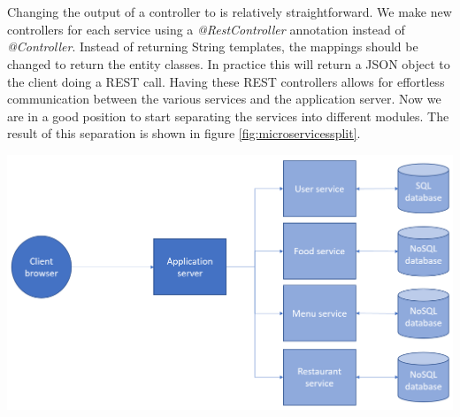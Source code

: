 \documentclass[12pt]{article}
\newenvironment{Figure}
	{\par\medskip\noindent\minipage{\linewidth}}
	{\endminipage\par\medskip}
\begin{document}
\begin{multicols}{2}
\\\\
Changing the output of a controller to is relatively straightforward. We make new controllers for each service using a \textit{@RestController} annotation instead of \textit{@Controller}. Instead of returning String templates, the mappings should be changed to return the entity classes. In practice this will return a JSON object to the client doing a REST call. Having these REST controllers allows for effortless communication between the various services and the application server. Now we are in a good position to start separating the services into different modules. The result of this separation is shown in figure \ref{fig:microservicessplit}.
\begin{Figure}
	\centering
	\includegraphics[width=\linewidth]{illustrations/projectstructure2.png}
	\label{fig:microservicessplit}
\end{Figure}

\end{multicols}
\end{document}
